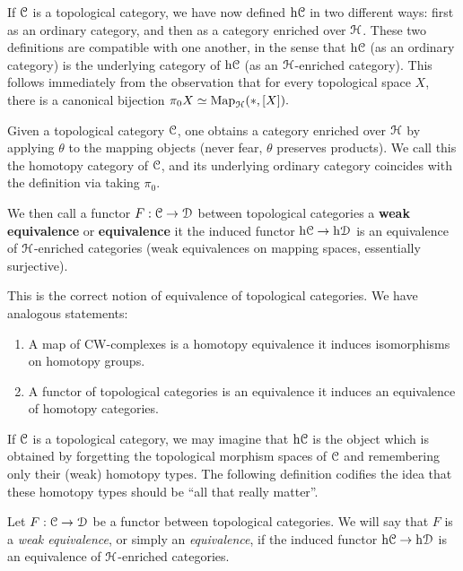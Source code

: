 \begin{1.1.3 Equivalences of Top Cats}
\begin{remark}
If $\operatorname{\mathcal{C}}$ is a topological category, we have now defined $\rm{h} \it{\operatorname{\mathcal{C}}}$ in two different ways: first as an ordinary category, and then as a category enriched over $\operatorname{\mathcal{H}}$. These two definitions are compatible with one another, in the sense that $\rm{h} \it{\operatorname{\mathcal{C}}}$ (as an ordinary category) is the
underlying category of $\rm{h} \it{\operatorname{\mathcal{C}}}$ (as an $\operatorname{\mathcal{H}}$-enriched category). This follows immediately
from the observation that for every topological space $X$, there is a canonical bijection
$\pi_0 X \simeq \operatorname{{Map}}_{\operatorname{\mathcal{H}}}( \ast, [X] ).$
\end{remark}
\begin{shaded}
Given a topological category $\operatorname{\mathcal{C}}$, one obtains a category enriched over $\operatorname{\mathcal{H}}$ by applying $\theta$ to the mapping objects (never fear, $\theta$ preserves products). We call this the homotopy category of $\operatorname{\mathcal{C}}$, and its underlying ordinary category coincides with the definition via taking $\pi_0$.

We then call a functor $F: \operatorname{\mathcal{C}} \rightarrow \operatorname{\mathcal{D}}$ between topological categories a \textbf{weak equivalence} or \textbf{equivalence} it the induced functor $\rm{h} \it{ \operatorname{\mathcal{C}}} \rightarrow \rm{h} \it{ \operatorname{\mathcal{D}}}$ is an equivalence of $\operatorname{\mathcal{H}}$-enriched categories (weak equivalences on mapping spaces, essentially surjective).

This is the correct notion of equivalence of topological categories. We have analogous statements:
\begin{enumerate}\squishlist
\item A map of CW-complexes is a homotopy equivalence \Iff it induces isomorphisms on homotopy groups.
\item A functor of topological categories is an equivalence \Iff it induces an equivalence of homotopy categories.
\end{enumerate}


\end{shaded}


If $\operatorname{\mathcal{C}}$ is a topological category, we may imagine that $\rm{h} \it{\operatorname{\mathcal{C}}}$ is the object which is obtained by forgetting the topological morphism spaces of $\operatorname{\mathcal{C}}$ and remembering only their (weak) homotopy types. The following definition codifies the idea that these homotopy types should be ``all that really matter''.

\begin{definition}\label{defequiv}
Let $F: \operatorname{\mathcal{C}} \rightarrow \operatorname{\mathcal{D}}$ be a functor between topological categories. We will say that $F$ is a {\it weak equivalence}, or simply an {\it equivalence}, if the induced functor
$\rm{h} \it{ \operatorname{\mathcal{C}}} \rightarrow \rm{h} \it{ \operatorname{\mathcal{D}}}$ is an equivalence of $\operatorname{\mathcal{H}}$-enriched categories.
\end{definition}


\end{1.1.3 Equivalences of Top Cats}
